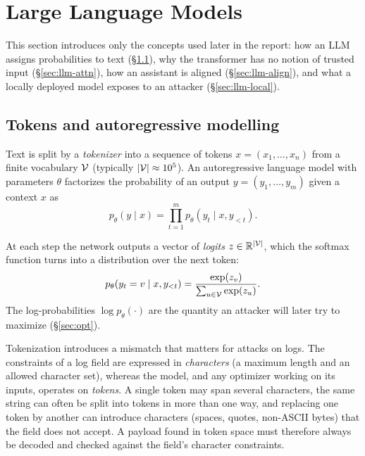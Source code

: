 \section{Large Language Models}
\label{sec:llm}

This section introduces only the concepts used later in the report: how an LLM assigns probabilities to text (\S\ref{sec:llm-ar}), why the transformer has no notion of trusted input (\S\ref{sec:llm-attn}), how an assistant is aligned (\S\ref{sec:llm-align}), and what a locally deployed model exposes to an attacker (\S\ref{sec:llm-local}).

\subsection{Tokens and autoregressive modelling}
\label{sec:llm-ar}

Text is split by a \emph{tokenizer} into a sequence of tokens $x = (x_1,\dots,x_n)$ from a finite vocabulary $\mathcal{V}$ (typically $|\mathcal{V}| \approx 10^5$). An autoregressive language model with parameters $\theta$ factorizes the probability of an output $y=(y_1,\dots,y_m)$ given a context $x$ as
\begin{equation}
p_\theta(y \mid x) = \prod_{t=1}^{m} p_\theta(y_t \mid x, y_{<t}).
\label{eq:ar}
\end{equation}

At each step the network outputs a vector of \emph{logits} $z \in \mathbb{R}^{|\mathcal{V}|}$, which the softmax function turns into a distribution over the next token:
\begin{equation}
p_\theta(y_t = v \mid x, y_{<t}) = \frac{\exp(z_v)}{\sum_{u\in\mathcal{V}}\exp(z_u)}.
\label{eq:softmax}
\end{equation}
The log-probabilities $\log p_\theta(\cdot)$ are the quantity an attacker will later try to maximize (\S\ref{sec:opt}).

Tokenization introduces a mismatch that matters for attacks on logs. The constraints of a log field are expressed in \emph{characters} (a maximum length and an allowed character set), whereas the model, and any optimizer working on its inputs, operates on \emph{tokens}. A single token may span several characters, the same string can often be split into tokens in more than one way, and replacing one token by another can introduce characters (spaces, quotes, non-ASCII bytes) that the field does not accept. A payload found in token space must therefore always be decoded and checked against the field's character constraints.

